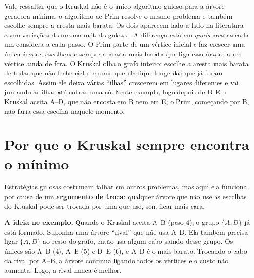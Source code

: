 \documentclass[a4paper]{article}
\begin{document}
Vale ressaltar que o Kruskal não é o único algoritmo guloso para a árvore
geradora mínima: o algoritmo de Prim resolve o mesmo problema e também escolhe
sempre a aresta mais barata. Os dois aparecem lado a lado na literatura como
variações do mesmo método guloso \cite[cap.~23]{cormen2012}. A diferença está em
\emph{quais} arestas cada um considera a cada passo. O Prim parte de um vértice
inicial e faz crescer uma única árvore, escolhendo sempre a aresta mais barata
que liga essa árvore a um vértice ainda de fora. O Kruskal olha o grafo inteiro:
escolhe a aresta mais barata de todas que não feche ciclo, mesmo que ela fique
longe das que já foram escolhidas. Assim ele deixa várias ``ilhas'' crescerem em
lugares diferentes e vai juntando as ilhas até sobrar uma só. Neste exemplo, logo
depois de B--E o Kruskal aceita A--D, que não encosta em B nem em E; o Prim,
começando por B, não faria essa escolha naquele momento.

\section{Por que o Kruskal sempre encontra o mínimo}\label{sec:prova}
Estratégias gulosas costumam falhar em outros problemas, mas aqui ela funciona
por causa de um \textbf{argumento de troca}: qualquer árvore que não use as
escolhas do Kruskal pode ser trocada por uma que use, sem ficar mais cara.

\textbf{A ideia no exemplo.} Quando o Kruskal aceita A--B (peso 4), o grupo
$\{A, D\}$ já está formado. Suponha uma árvore ``rival'' que não usa A--B. Ela
também precisa ligar $\{A, D\}$ ao resto do grafo, então usa algum cabo saindo
desse grupo. Os únicos são A--B (4), A--E (5) e D--E (6), e A--B é o mais barato.
Trocando o cabo da rival por A--B, a árvore continua ligando todos os vértices e
o custo não aumenta. Logo, a rival nunca é melhor.
\end{document}

